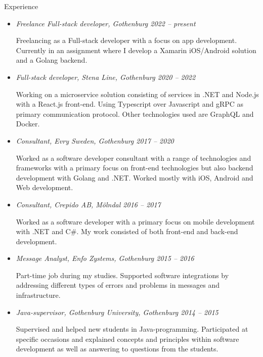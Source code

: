 {\itshape\Large\begin{center}
Experience
\end{center}}

\vspace{12px}

\begin{itemize}
  \item {\itshape Freelance Full-stack developer, Gothenburg 2022 – present}

  Freelancing as a Full-stack developer with a focus on app development. Currently in an assignment
  where I develop a Xamarin iOS/Android solution and a Golang backend.

  \item {\itshape Full-stack developer, Stena Line, Gothenburg 2020 – 2022}

  Working on a microservice solution consisting of services in .NET and Node.js with a React.js front-end.
  Using Typescript over Javascript and gRPC as primary communication protocol. Other technologies used are
  GraphQL and Docker.

  \item {\itshape Consultant, Evry Sweden, Gothenburg 2017 – 2020}

  Worked as a software developer consultant with a range of technologies and
  frameworks with a primary focus on front-end technologies but also backend development with Golang and .NET.
  Worked mostly with iOS, Android and Web development.

  \item {\itshape Consultant, Crepido AB, Mölndal 2016 – 2017}

  Worked as a software developer with a primary focus on mobile development with
  .NET and C\#. My work consisted of both front-end and back-end development.

  \item {\itshape Message Analyst, Enfo Zystems, Gothenburg 2015 – 2016}

  Part-time job during my studies. Supported software integrations by addressing
  different types of errors and problems in messages and infrastructure.

  \item {\itshape Java-supervisor, Gothenburg University, Gothenburg 2014 – 2015}

  Supervised and helped new students in Java-programming. Participated at specific
  occasions and explained concepts and principles within software development as
  well as answering to questions from the students.


\end{itemize}
